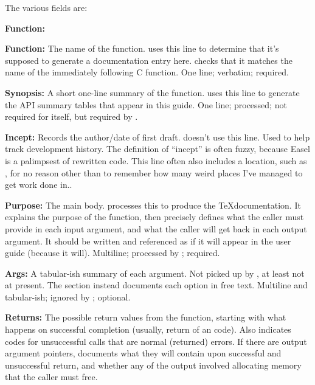 The various fields are:

\begin{sreitems}{\textbf{Function:}}
\item[\textbf{Function:}] 
  The name of the function.   uses this line to
  determine that it's supposed to generate a documentation entry here.
   checks that it matches the name of the immediately
  following C function. One line; verbatim; required.

\item[\textbf{Synopsis:}] 
  A short one-line summary of the function.  uses this
  line to generate the API summary tables that appear in this guide.
  One line; processed; not required for  itself, but
  required by . 

\item[\textbf{Incept:}] Records the author/date of first
  draft.  doesn't use this line.  Used to help track
  development history. The definition of ``incept'' is often fuzzy,
  because Easel is a palimpsest of rewritten code. This line often
  also includes a location, such as ,
  for no reason other than to remember how many weird places I've
  managed to get work done in..

\item[\textbf{Purpose:}] The main body.  processes this
  to produce the \TeX documentation. It explains the purpose of the
  function, then precisely defines what the caller must provide in
  each input argument, and what the caller will get back in each
  output argument. It should be written and referenced as if it will
  appear in the user guide (because it will). Multiline; processed by
  ; required.

\item[\textbf{Args:}] A tabular-ish summary of each argument. Not
  picked up by , at least not at present. The
   section instead documents each option in free text.
  Multiline and tabular-ish; ignored by ; optional.

\item[\textbf{Returns:}] The possible return values from the function,
  starting with what happens on successful completion (usually, return
  of an  code). Also indicates codes for unsuccessful
  calls that are normal (returned) errors. If there are output
  argument pointers, documents what they will contain upon successful
  and unsuccessful return, and whether any of the output involved
  allocating memory that the caller must free.


\end{sreitems}
